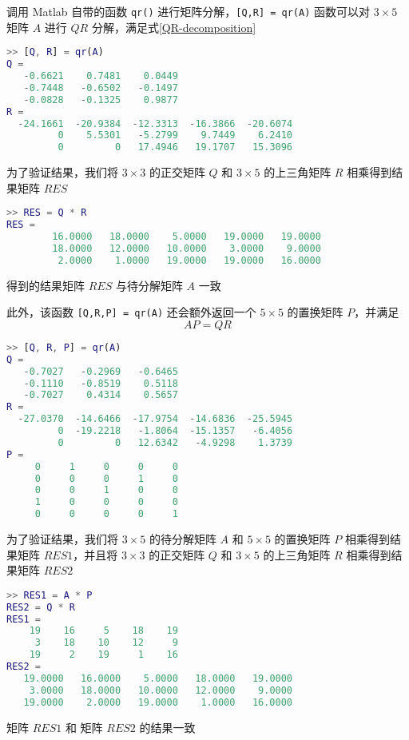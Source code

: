 调用 Matlab 自带的函数 \lstinline|qr()| 进行矩阵分解，\lstinline|[Q,R] = qr(A)| 函数可以对 $3\times 5$ 矩阵 $A$ 进行 $QR$ 分解，满足式\ref{QR-decomposition}

\begin{lstlisting}[language=Matlab]  
>> [Q, R] = qr(A)
Q =
   -0.6621    0.7481    0.0449
   -0.7448   -0.6502   -0.1497
   -0.0828   -0.1325    0.9877
R =
  -24.1661  -20.9384  -12.3313  -16.3866  -20.6074
         0    5.5301   -5.2799    9.7449    6.2410
         0         0   17.4946   19.1707   15.3096
\end{lstlisting}

为了验证结果，我们将 $3\times 3$ 的正交矩阵 $Q$ 和 $3\times 5$ 的上三角矩阵 $R$ 相乘得到结果矩阵 $RES$
\begin{lstlisting}[language=Matlab]  
>> RES = Q * R
RES =
        16.0000   18.0000    5.0000   19.0000   19.0000
        18.0000   12.0000   10.0000    3.0000    9.0000
         2.0000    1.0000   19.0000   19.0000   16.0000
\end{lstlisting}
得到的结果矩阵 $RES$ 与待分解矩阵 $A$ 一致


此外，该函数 \lstinline|[Q,R,P] = qr(A)| 还会额外返回一个 $5\times 5$ 的置换矩阵 $P$，并满足 
\begin{equation}
    AP = QR
\end{equation}
\begin{lstlisting}[language=Matlab]  
>> [Q, R, P] = qr(A)
Q =
   -0.7027   -0.2969   -0.6465
   -0.1110   -0.8519    0.5118
   -0.7027    0.4314    0.5657
R =
  -27.0370  -14.6466  -17.9754  -14.6836  -25.5945
         0  -19.2218   -1.8064  -15.1357   -6.4056
         0         0   12.6342   -4.9298    1.3739
P =
     0     1     0     0     0
     0     0     0     1     0
     0     0     1     0     0
     1     0     0     0     0
     0     0     0     0     1
\end{lstlisting}

为了验证结果，我们将
$3\times 5$ 的待分解矩阵 $A$ 和 $5\times 5$ 的置换矩阵 $P$ 相乘得到结果矩阵 $RES1$，并且将
$3\times 3$ 的正交矩阵 $Q$ 和 $3\times 5$ 的上三角矩阵 $R$ 相乘得到结果矩阵 $RES2$
\begin{lstlisting}[language=Matlab]  
>> RES1 = A * P
RES2 = Q * R
RES1 =
    19    16     5    18    19
     3    18    10    12     9
    19     2    19     1    16
RES2 =
   19.0000   16.0000    5.0000   18.0000   19.0000
    3.0000   18.0000   10.0000   12.0000    9.0000
   19.0000    2.0000   19.0000    1.0000   16.0000
\end{lstlisting}
矩阵 $RES1$ 和 矩阵 $RES2$ 的结果一致


